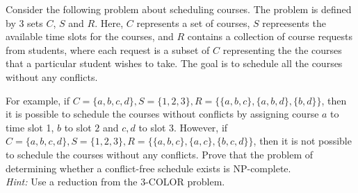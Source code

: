\problem{}
Consider the following problem about scheduling courses.  The problem is defined by 3 sets $C$, $S$ and $R$.  Here, $C$ represents a set of  courses, $S$ repreesents the available time slots for the courses, and $R$ contains a collection of course requests from students, where each request is a subset of $C$ representing the the courses that a particular student wishes to take.  The goal is to schedule all the courses without any conflicts.  

For example, if $C = \{a, b, c, d\}, S = \{1, 2, 3\}, R = \{\{a, b, c\}, \{a, b, d\}, \{b, d\}\}$, then it is possible to schedule the courses without conflicts by assigning course $a$ to time slot 1, $b$ to slot $2$ and $c, d$ to slot 3.  However, if $C = \{a, b, c, d\}, S = \{1, 2, 3\}, R = \{\{a, b, c\}, \{a, c\}, \{b, c, d\}\}$, then it is not possible to schedule the courses without any conflicts.  Prove that the problem of determining whether a conflict-free schedule exists is NP-complete. \\

\noindent  \emph{Hint:}  Use a reduction from the 3-COLOR problem.

\solution{}








\newpage